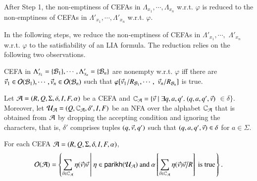 After Step 1, the non-emptiness of CEFAs in $\Lambda_{x_1}, \cdots, \Lambda_{x_n}$ w.r.t. $\varphi$ is reduced to the non-emptiness of CEFAs in $\Lambda'_{x_1}, \cdots, \Lambda'_{x_n}$ w.r.t. $\varphi$. 

In the following steps, we reduce the non-emptiness of CEFAs in $\Lambda'_{x_1}, \cdots, $ $\Lambda'_{x_n}$ w.r.t. $\varphi$ to the satisfiability of an LIA formula. The reduction relies on the following two observations. 

\begin{observation}\label{obs-cefa-output}
CEFA in $\Lambda'_{x_1} = \{\mathcal{B}_1\}, \cdots, \Lambda'_{x_n} = \{\mathcal{B}_n\}$ are nonempty w.r.t. $\varphi$ iff there are  $\vec{v}_1 \in \mathcal{O}(\mathcal{B}_1), \cdots, \vec{v}_n \in \mathcal{O}(\mathcal{B}_n)$ such that $\varphi[\vec{v}_1/R_{\mathcal{B}_{1}}, \cdots, $ $\vec{v}_n/R_{\mathcal{B}_{n}}]$ is true.
\end{observation}

Let $\mathcal{A} = (R, Q, \Sigma, \delta, I, F, \alpha)$ be a CEFA and $\mathbb{C}_{\mathcal{A}} = \{\vec{v} \mid \exists q, a, q'.\ (q, a, q', \vec{v}) $ $\in \delta\}$. 
Moreover, let $\mathcal{U}_{\mathcal{A}} = (Q, \mathbb{C}_{\mathcal{A}}, \delta', I, F)$ be an NFA over the alphabet $\mathbb{C}_{\mathcal{A}}$ that is obtained from $\mathcal{A}$ by dropping the accepting condition and ignoring the characters, that is, $\delta'$ comprises tuples $(q, \vec{v}, q')$ such that $(q, a, q', \vec{v}) \in \delta$ for $a \in \Sigma$.
%

\begin{observation}\label{obs-cefa-nfa}
For each CEFA $\mathcal{A} = (R, Q, \Sigma, \delta, I, F, \alpha)$, 
%
$$\mathcal{O}(\mathcal{A}) = \left\{\sum \limits_{\vec{v} \in \mathbb{C}_{\mathcal{A}}} \eta(\vec{v}) \vec{v} \left \vert\ \eta \in \mathsf{parikh}(\mathcal{U}_{\mathcal{A}}) \mbox{ and }  \alpha\left[  \sum \limits_{\vec{v} \in \mathbb{C}_{\mathcal{A}}} \eta(\vec{v}) \vec{v} \big{/}  R \right] \mbox{ is true}\right.\right\}.$$
%
\end{observation}



